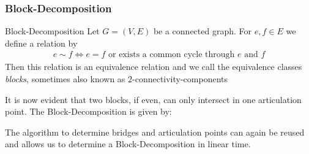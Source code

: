 \subsubsection{Block-Decomposition}
\begin{definition}[]{Block-Decomposition}
    Let $G = (V, E)$ be a connected graph. For $e, f \in E$ we define a relation by
    \begin{align*}
        e \sim f \Longleftrightarrow e = f \text{ or exists a common cycle through $e$ and } f
    \end{align*}
    Then this relation is an equivalence relation and we call the equivalence classes \textit{blocks}, sometimes also known as $2$-connectivity-components
\end{definition}
It is now evident that two blocks, if even, can only intersect in one articulation point.
The Block-Decomposition is given by:
\begin{center}
\end{center}
The algorithm to determine bridges and articulation points can again be reused and allows us to determine a Block-Decomposition in linear time.
